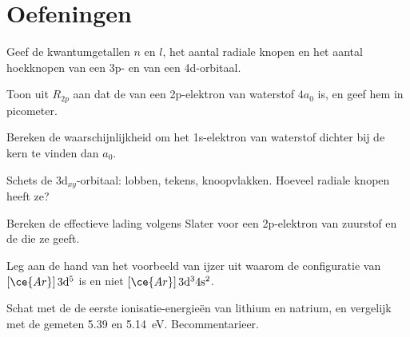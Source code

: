 \section{Oefeningen}

\begin{exercise}[$\star$]\label{exo:b2:atomic-orbitals:1}
Geef de kwantumgetallen $n$ en $l$, het aantal radiale knopen en het aantal hoekknopen
van een 3p- en van een 4d-orbitaal.
\end{exercise}

\begin{exercise}[$\star$]\label{exo:b2:atomic-orbitals:2}
Toon uit $R_{2p}$ aan dat de  van een 2p-elektron van waterstof
$4a_0$ is, en geef hem in picometer.
\end{exercise}

\begin{exercise}[$\star$]\label{exo:b2:atomic-orbitals:3}
Bereken de waarschijnlijkheid om het 1s-elektron van waterstof dichter bij de
kern te vinden dan $a_0$.
\end{exercise}

\begin{exercise}[$\star$]\label{exo:b2:atomic-orbitals:4}
Schets de $3\mathrm d_{xy}$-orbitaal: lobben, tekens, knoopvlakken. Hoeveel radiale
knopen heeft ze?
\end{exercise}

\begin{exercise}[$\star\star$]\label{exo:b2:atomic-orbitals:5}
Bereken de effectieve lading volgens Slater voor een 2p-elektron van zuurstof en de 
die ze geeft.
\end{exercise}

\begin{exercise}[$\star\star$]\label{exo:b2:atomic-orbitals:6}
Leg aan de hand van het voorbeeld van ijzer uit waarom de configuratie van 
$[\ce{Ar}]\,3\mathrm d^5$ is en niet $[\ce{Ar}]\,3\mathrm d^3 4\mathrm s^2$.
\end{exercise}

\begin{exercise}[$\star\star$]\label{exo:b2:atomic-orbitals:7}
Schat met de  de eerste ionisatie-energieën van lithium en natrium,
en vergelijk met de gemeten 5.39 en \qty{5.14}{eV}. Becommentarieer.
\end{exercise}


